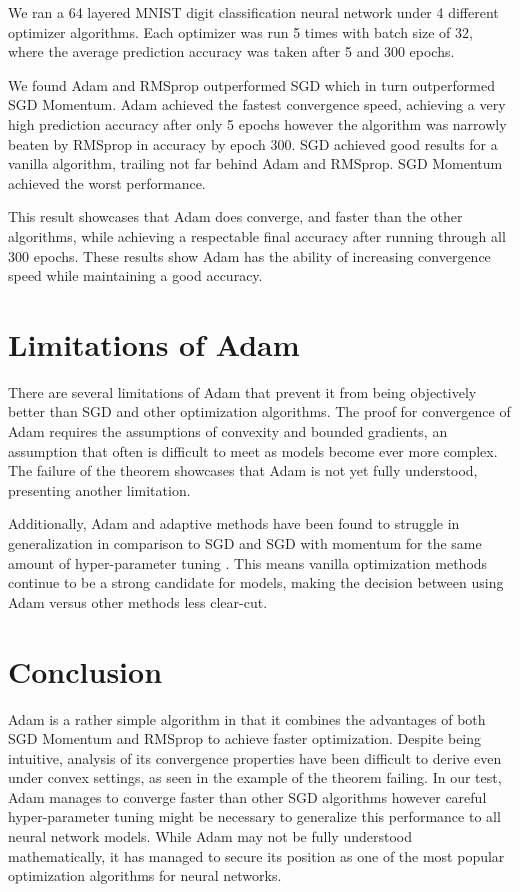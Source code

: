 \documentclass[nohyperref]{article}
\theoremstyle{plain}
\theoremstyle{definition}
\theoremstyle{remark}
\begin{document}
We ran a 64 layered MNIST digit classification neural network under 4 different optimizer algorithms. Each optimizer was run 5 times with batch size of 32, where the average prediction accuracy was taken after 5 and 300 epochs. 

We found Adam and RMSprop outperformed SGD which in turn outperformed SGD Momentum. Adam achieved the fastest convergence speed, achieving a very high prediction accuracy after only 5 epochs however the algorithm was narrowly beaten by RMSprop in accuracy by epoch 300. SGD achieved good results for a vanilla algorithm, trailing not far behind Adam and RMSprop. SGD Momentum achieved the worst performance.

This result showcases that Adam does converge, and faster than the other algorithms, while achieving a respectable final accuracy after running through all 300 epochs. These results show Adam has the ability of increasing convergence speed while maintaining a good accuracy.\\

\section{Limitations of Adam} %
There are several limitations of Adam that prevent it from being objectively better than SGD and other optimization algorithms. The proof for convergence of Adam requires the assumptions of convexity and bounded gradients, an assumption that often is difficult to meet as models become ever more complex. The failure of the theorem showcases that Adam is not yet fully understood, presenting another limitation.

Additionally, Adam and adaptive methods have been found to struggle in generalization in comparison to SGD and SGD with momentum for the same amount of hyper-parameter tuning \cite{Wilson17}. This means vanilla optimization methods continue to be a strong candidate for models, making the decision between using Adam versus other methods less clear-cut.\\

\section{Conclusion}
Adam is a rather simple algorithm in that it combines the advantages of both SGD Momentum and RMSprop to achieve faster optimization. Despite being intuitive, analysis of its convergence properties have been difficult to derive even under convex settings, as seen in the example of the theorem failing. In our test, Adam manages to converge faster than other SGD algorithms however careful hyper-parameter tuning might be necessary to generalize this performance to all neural network models. While Adam may not be fully understood mathematically, it has managed to secure its position as one of the most popular optimization algorithms for neural networks.\\
\end{document}

